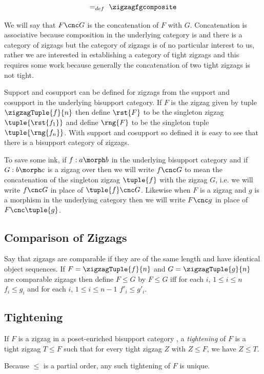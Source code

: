 $$
=_{def} \  \zigzagfgcomposite
$$

We will say that $F \cnc G$ is the concatenation of $F$ with $G$.
Concatenation is associative because composition in the underlying category
is and there is a category of zigzags but the category of zigzags is of no particular interest to us, rather we are interested in establishing a category of tight zigzags and this requires some work because generally the concatenation of two tight zigzags is not tight.  

Support and cosupport can be defined for zigzags from the support and cosupport in the underlying bisupport category. 
If $F$ is the zigzag  
given by tuple $\zigzagTuple{f}{n}$ then define $\rst{F}$ to be 
the singleton zigzag $\tuple{\rst{f_1}}$ and define
$\rng{F}$ to be the singleton tuple $\tuple{\rng{f_n}}$.
With support and cosupport so defined it is easy to see  that there is  a bisupport category of zigzags.  

To save some ink, if $f: a \morph b$ 
in the underlying bisupport category \catcw 
and if $G:b \morph c$ is a zigzag
over \catcw then we will write $f \cnc G$ to mean the concatenation
of the singleton zigzag $\tuple{f}$ with the zigzag $G$, i.e. we will write
$f \cnc G$ in place of $\tuple{f} \cnc G$. Likewise when $F$ is a zigzag and 
$g$ is a morphism in the underlying category then we will write
$F \cnc g$ in place of $F \cnc \tuple{g}$.

\subsection{Comparison of Zigzags}

Say that zigzags are comparable if they are of the same length
and have identical object sequences.
If $F=\zigzagTuple{f}{n}$ and 
$G=\zigzagTuple{g}{n}$
 are comparable zigzags then define $F \leq G$
by $F \leq G$ iff for each $i$, $1 \leq i \leq n$
$f_i \leq g_i$ and for each $i$, $1 \leq i \leq n-1$ $f'_i \leq g'_i$.

\subsection{Tightening}

If $F$ is a zigzag in a poset-enriched bisupport category \catcw, 
a \textit{tightening} of $F$ is a tight zigzag
$T \leq F$ such that for every tight zigzag $Z$ with $Z \leq F$,
we have $Z \leq T$.

Because $\leq$ is a partial order, any such tightening of $F$ is unique.

